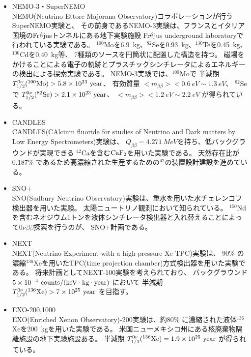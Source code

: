\documentclass[a4paper,10pt]{jreport}
\begin{document}
\begin{itemize}
	\item NEMO-3・SuperNEMO \\
	NEMO(Neutrino Ettore Majorana Observatory)コラボレーションが行うSuperNEMO実験と、
	その前身であるNEMO-3実験は、フランスとイタリア国境のFr$\acute{\rm{e}}$jusトンネルにある地下実験施設
	Fr$\acute{\rm{e}}$jus underground laboratoryで行われている実験である。
	$^{100}$Moを\SI{6.9}{kg}、$^{82}$Seを\SI{0.93}{kg}、$^{130}$Teを\SI{0.45}{kg}、$^{100}$Cdを\SI{0.40}{kg}等、
	7種類のソースを円筒状に配置した構造を持つ。
	磁場をかけることによる電子の軌跡とプラスチックシンチレータによるエネルギーの検出による探索実験である。
	NEMO-3実験では、$^{100}$Moで
	半減期 $T_{1/2}^{0\nu}(^{100}\rm{Mo}) > 5.8 \times 10^{23} \ \rm{year}$、
	有効質量 $< m_{\beta\beta} > < \SI{0.6}{eV} \sim \SI{1.3}{eV}$、
	$^{82}$Seで
	$T_{1/2}^{0\nu}(^{82}\rm{Se}) > 2.1 \times 10^{23} \ \rm{year}$、
	$< m_{\beta\beta} > < \SI{1.2}{eV} \sim \SI{2.2}{eV}$
	が得られている。
	\cite{NEMO}
	
	\item CANDLES \\
	CANDLES(CAlcium fluoride for studies of Neutrino and Dark matters by Low Energy Spectrometers)実験は、
	$Q_{\beta\beta}=\SI{4.271}{MeV}$を持ち、低バックグラウンドが実現できる
	$^{42}$Caを含む$\rm{CaF_2}$を用いた実験である。
	天然存在比が0.187\% であるため高濃縮された生産するための$^{42}$の装置設計建設を進めている。
	\cite{CANDLES}
	
	\item SNO+ \\
	SNO(Sudbury Neutrino Observatory)実験は、重水を用いた水チェレンコフ検出器を用いた実験。
	太陽ニュートリノ観測において知られている。
	$^{150}$Ndを含むネオジウム1トンを液体シンチレータ検出器と入れ替えることによって$0\nu\beta\beta$探索を行うのが、
	SNO+計画である。
	
	\item NEXT \\
	 NEXT(Neutrino Experiment with a high-pressure Xe TPC)実験は、
	 90\% の濃縮$^{136}$Xeを用いたTPC(time projection chamber)方式検出器を用いた実験である。
	 将来計画としてNEXT-100実験を考えられており、
	 バックグラウンド $5 \times 10^{-4} \ \rm{ counts/(keV \cdot kg \cdot year)}$
	 において
	 半減期 $T_{1/2}^{0\nu}(^{136}\rm{Xe}) > 7 \times 10^{25} \ \rm{year}$
	 を目指す。
	\cite{NEXT}
	
	\item EXO-200,1000 \\
	EXO(Enriched Xenon Observatory)-200実験は、約80\% に濃縮された液体$^{136}$Xeを\SI{200}{kg}を用いた実験である。
	米国ニューメキシコ州にある核廃棄物隔離施設の地下実験施設ある。
	半減期 $T_{1/2}^{0\nu}(^{136}\rm{Xe}) = 1.9 \times 10^{25} \ \rm{year}$
	が得られている。
	\cite{EXO}
	

\end{itemize}
\end{document}
